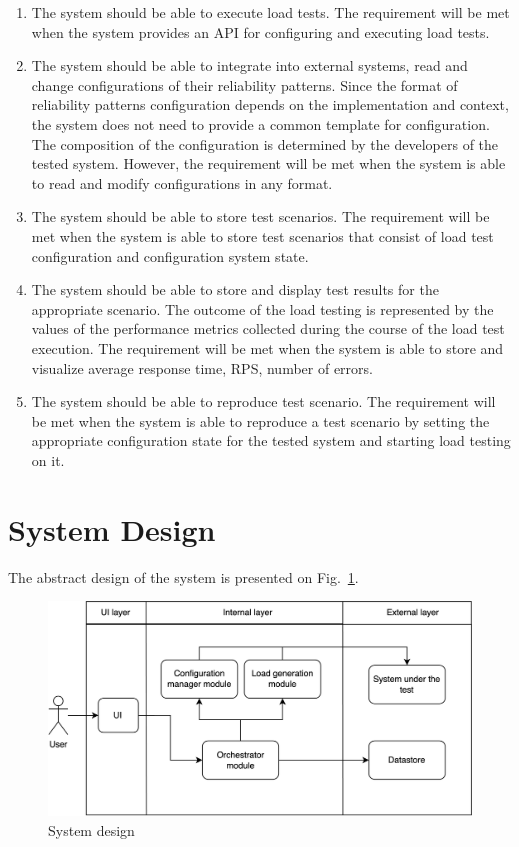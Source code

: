 \begin{enumerate}
    \item\label{subsec:fr:execute_load_test} The system should be able to execute load tests. The requirement will be met when the system provides an API for configuring and executing load tests.
    \item\label{subsec:fr:integrate} The system should be able to integrate into external systems, read and change configurations of their reliability patterns. Since the format of reliability patterns configuration depends on the implementation and context, the system does not need to provide a common template for configuration. The composition of the configuration is determined by the developers of the tested system. However, the requirement will be met when the system is able to read and modify configurations in any format.
    \item\label{subsec:fr:store_scenarios} The system should be able to store test scenarios. The requirement will be met when the system is able to store test scenarios that consist of load test configuration and configuration system state.
    \item\label{subsec:fr:store_results} The system should be able to store and display test results for the appropriate scenario. The outcome of the load testing is represented by the values of the performance metrics collected during the course of the load test execution. The requirement will be met when the system is able to store and visualize average response time, RPS, number of errors.
    \item\label{subsec:fr:reproduce} The system should be able to reproduce test scenario. The requirement will be met when the system is able to reproduce a test scenario by setting the appropriate configuration state for the tested system and starting load testing on it.
\end{enumerate}

\section{System Design}\label{sec:system_design}
The abstract design of the system is presented on Fig.~\ref{fig:design}.

\begin{figure}[t]
    \centering
    \includegraphics[height=\textheight,width=\textwidth,keepaspectratio]{design.png}
    \caption{System design}
    \label{fig:design}
\end{figure}

